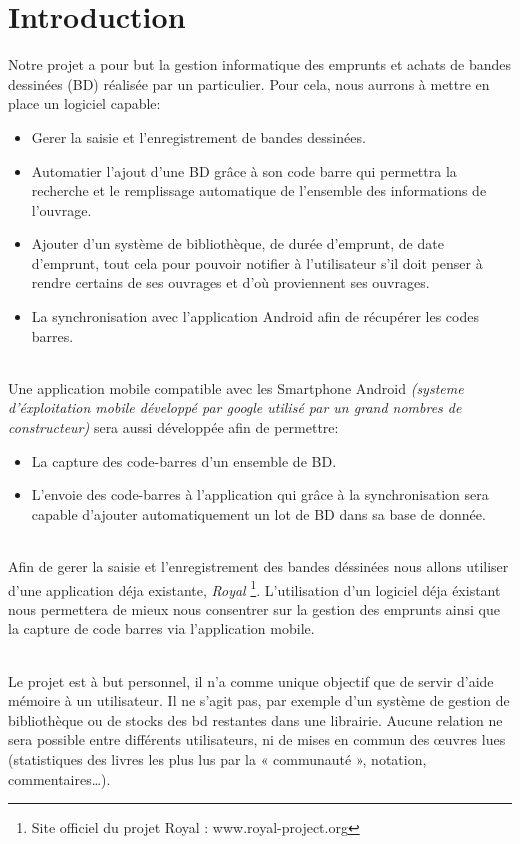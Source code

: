 \part*{Introduction}
Notre projet a pour but la gestion informatique des emprunts et achats de bandes dessinées (BD) réalisée par un particulier.
Pour cela, nous aurrons à mettre en place un logiciel capable: 
\begin{itemize}
\item Gerer la saisie et l'enregistrement de bandes dessinées.
\item Automatier l'ajout d'une BD grâce à son code barre qui permettra la recherche et le remplissage automatique de l'ensemble des informations de l'ouvrage.
\item Ajouter d'un système de bibliothèque, de durée d'emprunt, de date d'emprunt, tout cela pour pouvoir notifier à l'utilisateur s'il doit penser à rendre certains de ses ouvrages et d'où proviennent ses ouvrages.
\item La synchronisation avec l'application Android afin de récupérer les codes barres.
\end{itemize}


\paragraph{}
Une application mobile compatible avec les Smartphone Android \textit{(systeme d'éxploitation mobile développé par google utilisé par un grand nombres de constructeur)} sera aussi développée afin de permettre:
\begin{itemize}
\item La capture des code-barres d'un ensemble de BD.
\item L'envoie des code-barres à l'application qui grâce à la synchronisation sera capable d'ajouter automatiquement un lot de BD dans sa base de donnée.
\end{itemize}

\paragraph{}
Afin de gerer la saisie et l'enregistrement des bandes déssinées nous allons utiliser d'une application déja existante, 
\emph{Royal} \footnote{Site officiel du projet Royal : www.royal-project.org}. 
L'utilisation d'un logiciel déja éxistant nous permettera de mieux nous consentrer sur la gestion des emprunts ainsi que la capture de code barres via l'application mobile.

\paragraph{}
Le projet est à but personnel, il n'a comme unique objectif que de servir d'aide mémoire à un utilisateur.
Il ne s'agit pas, par exemple d'un système de gestion de bibliothèque ou de stocks des bd restantes dans une librairie.
Aucune relation ne sera possible entre différents utilisateurs, ni de mises en commun des œuvres lues
(statistiques des livres les plus lus par la « communauté », notation, commentaires…).
